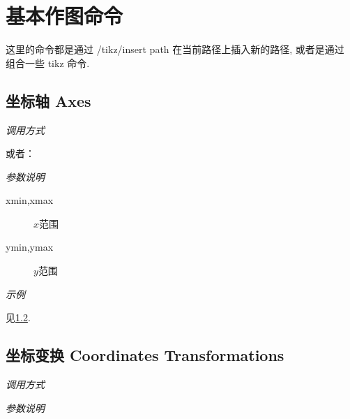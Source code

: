 \chapter{基本作图命令}

这里的命令都是通过 /tikz/insert path\cite{PATH} 在当前路径上插入新的路径, 或者是通过  组合一些 tikz 命令.

\section{坐标轴 Axes}

\emph{调用方式}

\begin{tcolorbox}{}
\end{tcolorbox}

或者：

\begin{tcolorbox}{}
\end{tcolorbox}

\emph{参数说明}

\begin{description}
  \item[xmin,xmax] $x$范围
  \item[ymin,ymax] $y$范围
\end{description}

\emph{示例}

见\ref{sec:transform}.

\section{坐标变换 Coordinates Transformations}\label{sec:transform}

\emph{调用方式}

\begin{tcolorbox}{}
\end{tcolorbox}

\emph{参数说明}

